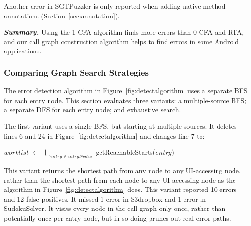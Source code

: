 Another error in SGTPuzzler is only reported when adding \annotationnum native method
annotations (Section~\ref{sec:annotation}). 



\vspace{1mm}

\noindent \textbf{\textit{Summary.}} Using the 1-CFA 
algorithm finds more errors than 0-CFA and RTA, and our call
graph construction algorithm helps to find errors in some
Android applications.


\subsubsection{Comparing Graph Search Strategies}
\label{sec:search}

The error detection algorithm in Figure~\ref{fig:detectalgorithm} uses a
separate BFS for each entry node.  This section evaluates three variants:
a multiple-source BFS; a separate DFS for each entry node; and exhaustive
search.

The first variant uses a single BFS, but starting at multiple sources.  It deletes
lines 6 and 24 in Figure~\ref{fig:detectalgorithm} and changes line
7 to:

\vspace{0.2mm}
$\mathit{worklist}$ $\leftarrow$ $\bigcup_{\mathit{entry} \in \mathit{entryNodes}}$ getReachableStarts($\mathit{entry}$)
\vspace{0.2mm}

\noindent This variant returns the shortest path from any  node
to any UI-accessing node, rather than the shortest path from each
 node to any UI-accessing node as the algorithm in
Figure~\ref{fig:detectalgorithm} does.
This variant reported 10 errors and 12 false positives.   It missed 1 error in S3dropbox and 1 error in
SudokuSolver.
It visits every node in the call graph only once, rather than potentially
once per entry node, but in so doing prunes out real error paths.

